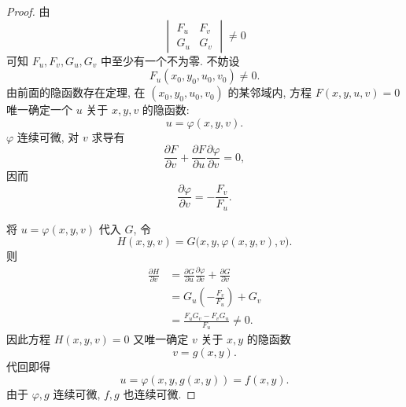 \begin{proof}
	由
	\[
	\begin{vmatrix}
	F_u&F_v\\
	G_u&G_v
	\end{vmatrix}
	\ne0
	\]
	可知 $F_u,F_v,G_u,G_v$ 中至少有一个不为零.
	不妨设
	\[
	F_u(x_0,y_0,u_0,v_0)\ne0.
	\]
	由前面的隐函数存在定理, 在
	$(x_0,y_0,u_0,v_0)$ 的某邻域内,
	方程 $F(x,y,u,v)=0$ 唯一确定一个 $u$ 关于 $x,y,v$ 的隐函数:
	\[
	u=\varphi(x,y,v).
	\]
	$\varphi$ 连续可微, 对 $v$ 求导有
	\[
	\frac{\partial F}{\partial v}
	+
	\frac{\partial F}{\partial u}
	\frac{\partial\varphi}{\partial v}
	=0,
	\]
	因而
	\[
	\frac{\partial\varphi}{\partial v}
	=
	-\frac{F_v}{F_u}.
	\]

	将 $u=\varphi(x,y,v)$ 代入 $G$, 令
	\[
	H(x,y,v)
	=
	G\bigl(x,y,\varphi(x,y,v),v\bigr).
	\]
	则
	\[
	\begin{aligned}
	\frac{\partial H}{\partial v}
	&=
	\frac{\partial G}{\partial u}
	\frac{\partial\varphi}{\partial v}
	+\frac{\partial G}{\partial v}\\
	&=
	G_u\left(-\frac{F_v}{F_u}\right)+G_v\\
	&=
	\frac{F_uG_v-F_vG_u}{F_u}
	\ne0.
	\end{aligned}
	\]
	因此方程 $H(x,y,v)=0$ 又唯一确定 $v$ 关于 $x,y$ 的隐函数
	\[
	v=g(x,y).
	\]
	代回即得
	\[
	u=\varphi(x,y,g(x,y))=f(x,y).
	\]
	由于 $\varphi,g$ 连续可微, $f,g$ 也连续可微.


\end{proof}
